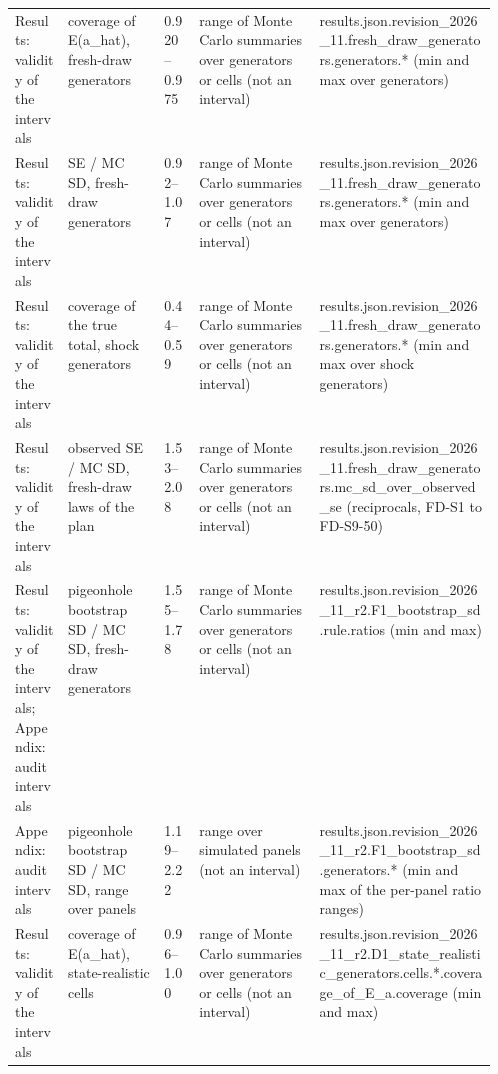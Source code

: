 \begin{table}[!tbp]
\begin{tabularx}{\linewidth}{@{}p{0.11\linewidth}p{0.2\linewidth}lp{0.25\linewidth}X@{}}
Results: validity of the intervals & coverage of E(a\_hat), fresh-draw generators & 0.920--0.975 & range of Monte Carlo summaries over generators or cells (not an interval) & {\ttfamily\tiny results.\allowbreak{}json.\allowbreak{}revision\_2026\_11.\allowbreak{}fresh\_draw\_generators.\allowbreak{}generators.\allowbreak{}* (min and max over generators)} \\
Results: validity of the intervals & SE / MC SD, fresh-draw generators & 0.92--1.07 & range of Monte Carlo summaries over generators or cells (not an interval) & {\ttfamily\tiny results.\allowbreak{}json.\allowbreak{}revision\_2026\_11.\allowbreak{}fresh\_draw\_generators.\allowbreak{}generators.\allowbreak{}* (min and max over generators)} \\
Results: validity of the intervals & coverage of the true total, shock generators & 0.44--0.59 & range of Monte Carlo summaries over generators or cells (not an interval) & {\ttfamily\tiny results.\allowbreak{}json.\allowbreak{}revision\_2026\_11.\allowbreak{}fresh\_draw\_generators.\allowbreak{}generators.\allowbreak{}* (min and max over shock generators)} \\
Results: validity of the intervals & observed SE / MC SD, fresh-draw laws of the plan & 1.53--2.08 & range of Monte Carlo summaries over generators or cells (not an interval) & {\ttfamily\tiny results.\allowbreak{}json.\allowbreak{}revision\_2026\_11.\allowbreak{}fresh\_draw\_generators.\allowbreak{}mc\_sd\_over\_observed\_se (reciprocals, FD-S1 to FD-S9-50)} \\
Results: validity of the intervals; Appendix: audit intervals & pigeonhole bootstrap SD / MC SD, fresh-draw generators & 1.55--1.78 & range of Monte Carlo summaries over generators or cells (not an interval) & {\ttfamily\tiny results.\allowbreak{}json.\allowbreak{}revision\_2026\_11\_r2.\allowbreak{}F1\_bootstrap\_sd.\allowbreak{}rule.\allowbreak{}ratios (min and max)} \\
Appendix: audit intervals & pigeonhole bootstrap SD / MC SD, range over panels & 1.19--2.22 & range over simulated panels (not an interval) & {\ttfamily\tiny results.\allowbreak{}json.\allowbreak{}revision\_2026\_11\_r2.\allowbreak{}F1\_bootstrap\_sd.\allowbreak{}generators.\allowbreak{}* (min and max of the per-panel ratio ranges)} \\
Results: validity of the intervals & coverage of E(a\_hat), state-realistic cells & 0.96--1.00 & range of Monte Carlo summaries over generators or cells (not an interval) & {\ttfamily\tiny results.\allowbreak{}json.\allowbreak{}revision\_2026\_11\_r2.\allowbreak{}D1\_state\_realistic\_generators.\allowbreak{}cells.\allowbreak{}*.\allowbreak{}coverage\_of\_E\_a.\allowbreak{}coverage (min and max)} \\

\end{tabularx}
\end{table}
